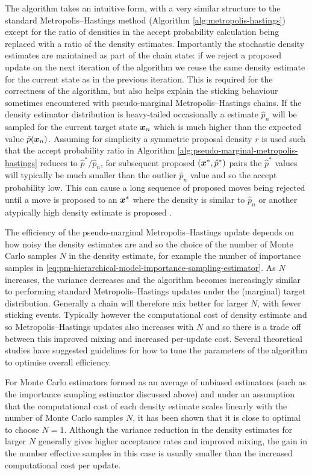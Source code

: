 The algorithm takes an intuitive form, with a very similar structure to the standard Metropolis--Hastings method (Algorithm \ref{alg:metropolis-hastings}) except for the ratio of densities in the accept probability calculation being replaced with a ratio of the density estimates. Importantly the stochastic density estimates are maintained as part of the chain state: if we reject a proposed update on the next iteration of the algorithm we reuse the same density estimate for the current state as in the previous iteration. This is required for the correctness of the algorithm, but also helps explain the sticking behaviour sometimes encountered with pseudo-marginal Metropolis--Hastings chains. If the density estimator distribution is heavy-tailed occasionally a estimate $\hat{p}_n$ will be sampled for the current target state $\boldsymbol{x}_n$ which is much higher than the expected value $\tilde{p}(\boldsymbol{x}_n)$. Assuming for simplicity a symmetric proposal density $r$ is used such that the accept probability ratio in Algorithm \ref{alg:pseudo-marginal-metropolis-hastings} reduces to $\hat{p}^* / \hat{p}_n$, for subsequent proposed $(\boldsymbol{x}^*,\hat{p}^*)$ pairs the $\hat{p}^*$ values will typically be much smaller than the outlier $\hat{p}_n$ value and so the accept probability low. This can cause a long sequence of proposed moves being rejected until a move is proposed to an $\boldsymbol{x}^*$ where the density is similar to $\hat{p}_n$ or another atypically high density estimate is proposed \citep{filippone2014pseudo,andrieu2009pseudo,sherlock2015efficiency}.

The efficiency of the pseudo-marginal Metropolis--Hastings update depends on how noisy the density estimates are and so the choice of the number of Monte Carlo samples $N$ in the density estimate, for example the number of importance samples in \eqref{eq:pm-hierarchical-model-importance-sampling-estimator}. As $N$ increases, the variance decreases and the algorithm becomes increasingly similar to performing standard Metropolis--Hastings updates under the (marginal) target distribution. Generally a chain will therefore mix better for larger $N$, with fewer sticking events. Typically however the computational cost of density estimate and so Metropolis--Hastings updates also increases with $N$ and so there is a trade off between this improved mixing and increased per-update cost. Several theoretical studies have suggested guidelines for how to tune the parameters of the algorithm to optimise overall efficiency.

For Monte Carlo estimators formed as an average of unbiased estimators (such as the importance sampling estimator discussed above) and under an assumption that the computational cost of each density estimate scales linearly with the number of Monte Carlo samples $N$, it has been shown \citep{sherlock2016pseudo,bornn2017use} that it is close to optimal to choose $N = 1$. Although the variance reduction in the density estimates for larger $N$ generally gives higher acceptance rates and improved mixing, the gain in the number effective samples in this case is usually smaller than the increased computational cost per update.

